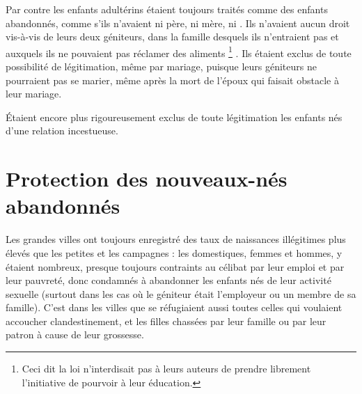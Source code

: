  Par contre les enfants adultérins étaient toujours traités comme des enfants abandonnés, comme s'ils n'avaient ni père, ni mère, ni . Ils n'avaient aucun droit vis-à-vis de leurs deux géniteurs, dans la famille desquels ils n'entraient pas et auxquels ils ne pouvaient pas réclamer des aliments%
\footnote{Ceci dit la loi n'interdisait pas à leurs auteurs de prendre librement l'initiative de pourvoir à leur éducation.}%
. Ils étaient exclus de toute possibilité de légitimation, même par mariage, puisque leurs géniteurs ne pourraient pas se marier, même après la mort de l'époux qui faisait obstacle à leur mariage. 

 Étaient encore plus rigoureusement exclus de toute légitimation les enfants nés d'une relation incestueuse.


\section{Protection des nouveaux-nés abandonnés}

 Les grandes villes ont toujours enregistré des taux de naissances illégitimes plus élevés que les petites et les campagnes : les domestiques, femmes et hommes, y étaient nombreux, presque toujours contraints au célibat par leur emploi et par leur pauvreté, donc condamnés à abandonner les enfants nés de leur activité sexuelle (surtout dans les cas où le géniteur était l'employeur ou un membre de sa famille). C'est dans les villes que se réfugiaient aussi toutes celles qui voulaient accoucher clandestinement, et les filles chassées par leur famille ou par leur patron à cause de leur grossesse.

